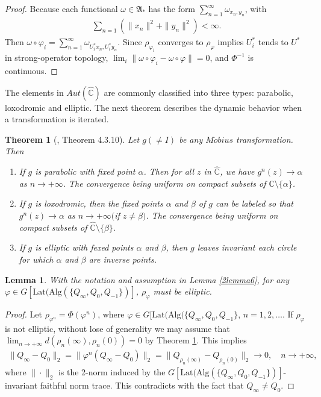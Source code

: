 \documentclass{amsart}
\newcommand{\AAA}{\mathfrak A}
\newcommand{\Lat}{\mathrm{Lat}}
\newcommand{\Alg}{\mathrm{Alg}}
\newcommand{\C}{\mathbb C} %
\newtheorem{theorem}{Theorem}[section]
\newtheorem{lemma}{Lemma}[section]
\begin{document}
\begin{proof}
Because each functional $\omega \in \AAA_{*}$ has the form $\sum_{n=1}^{\infty}  \omega_{x_n, y_n}$, with
\begin{align*}
\sum_{n = 1} (\|x_n\|^2 + \|y_n\|^2) < \infty.
\end{align*}
Then $\omega \circ \varphi_{i} = \sum_{n=1}^{\infty}  \omega_{U_{i}^{*}x_n, U_{i}^{*}y_n}$.
Since $\rho_{\varphi_i}$ converges to $\rho_{\varphi}$ implies $U_i^{*}$ tends to $U^{*}$ in strong-operator topology, $\lim_{i} \| \omega \circ \varphi_{i} - \omega \circ \varphi\| = 0$, and $\Phi^{-1}$ is continuous.
\end{proof}

The elements in $Aut(\widehat{\C})$ are commonly classified into three types:
parabolic, loxodromic and elliptic. The next theorem describes the dynamic 
behavior when a transformation is iterated.


\begin{theorem}[\cite{BA}, Theorem 4.3.10]\label{2thm1}
Let $g (\neq I)$ be any $M\ddot{o}bius$ transformation. Then
\begin{enumerate}
\item If $g$ is parabolic with fixed point $\alpha$. Then for all $z$ in $\widehat{\C}$, we have
$g^{n}(z) \rightarrow \alpha$ as $n \rightarrow +\infty$. The convergence being uniform on compact subsets of $\C \setminus \{ \alpha \}$.
\item If $g$ is loxodromic, then the fixed points $\alpha$ and $\beta$ of $g$ can be labeled so that $g^{n}(z) \rightarrow \alpha$ as
$n \rightarrow +\infty ($if $z \neq \beta)$. The convergence being uniform on compact subsets of $\widehat{\C} \setminus \{ \beta \}$.
\item If $g$ is elliptic with fexed points $\alpha$ and $\beta$, then $g$ leaves invariant each circle for which
$\alpha$ and $\beta$ are inverse points.
\end{enumerate}
\end{theorem}

\begin{lemma}
With the notation and assumption in Lemma \ref{2lemma6}, for any $\varphi \in G[\Lat(\Alg( \{ Q_{\infty},  Q_{0}, Q_{-1} \})]$, $\rho_{\varphi}$ must be elliptic.
\end{lemma}

\begin{proof}
Let $\rho_{\varphi^{n}} = \Phi(\varphi^{n})$, where $\varphi \in G[\Lat(\Alg( \{ Q_{\infty},  Q_{0}, Q_{-1} \}$, $ n = 1, 2, \ldots$. If $\rho_{\varphi}$ is not elliptic, without lose of generality we may assume that $\lim_{n \rightarrow +\infty} d(\rho_{n}(\infty), \rho_{n}(0)) = 0$ by Theorem \ref{2thm1}. This implies 
\begin{align*}
\| Q_{\infty} - Q_{0} \|_{2} = \| \varphi^{n}(Q_{\infty} - Q_{0}) \|_{2} =\| Q_{\rho_n(\infty)} - Q_{\rho_n(0)} \|_{2} \rightarrow 0, \quad n \rightarrow +\infty,
\end{align*}
where $\| \cdot \|_2$ is the 2-norm induced by the $ G[\Lat(\Alg( \{ Q_{\infty},  Q_{0}, Q_{-1} \})]$-invariant faithful norm trace.
This contradicts with the fact that $Q_{\infty} \neq Q_{0}$.
\end{proof}
\end{document}
